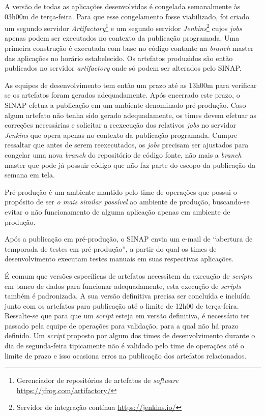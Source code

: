 A versão de todas as aplicações desenvolvidas é congelada semanalmente
às 03h00m de terça-feira. Para que esse congelamento fosse viabilizado, foi
criado um segundo servidor \textit{Artifactory}\footnote{Gerenciador de
repositórios de artefatos de \textit{software} \url{https://jfrog.com/artifactory/}}
e um segundo servidor \textit{Jenkins}\footnote{Servidor de integração contínua
\url{https://jenkins.io/}}
cujos \textit{jobs} apenas podem ser executados no
contexto da publicação programada. Uma primeira construção é executada com
base no código contante na \textit{branch} master das aplicações no horário
estabelecido. Os artefatos produzidos são então publicados no servidor
\textit{artifactory} onde só podem ser alterados pelo \acrshort{SINAP}.

As equipes de desenvolvimento tem então um prazo até
as 13h00m para verificar se os artefatos foram gerados adequadamente. Após
encerrado este prazo, o \acrshort{SINAP} efetua a publicação
em um ambiente denominado pré-produção. Caso algum artefato não tenha sido
gerado adequadamente, os times devem efetuar as correções necessárias e
solicitar a reexecução dos relativos \textit{jobs} no servidor \textit{Jenkins}
que opera apenas no contexto da publicação programada. Cumpre ressaltar que
antes de serem reexecutados, os \textit{jobs} precisam ser ajustados para
congelar uma nova \textit{branch} do repositório de código fonte, não mais a
\textit{branch} master que pode já possuir código que não faz parte do escopo
da publicação da semana em tela.

Pré-produção é um ambiente mantido pelo time de operações que possui o
propósito de ser \emph{o mais similar possível} ao ambiente de produção,
buscando-se evitar o não funcionamento de alguma aplicação apenas em ambiente
de produção.

Após a publicação em pré-produção, o \acrshort{SINAP} envia um e-mail de
``abertura de temporada de testes em pré-produção'', a partir do qual os times
de desenvolvimento executam testes manuais em suas respectivas aplicações.

É comum que versões específicas de artefatos necessitem da execução de
\textit{scripts} em banco de dados para funcionar adequadamente, esta execução
de \textit{scripts} também é padronizada. A sua versão definitiva
precisa ser concluída e incluída junto com os artefatos para publicação até o
limite de 12h00 de terça-feira. Ressalte-se que para que um \textit{script}
esteja em versão definitiva, é necessário ter passado pela equipe de operações
para validação, para a qual não há prazo definido. Um \textit{script}
proposto por algum dos times de desenvolvimento durante o dia de segunda-feira
tipicamente não é validado pelo time de operações até o limite de prazo e isso
ocasiona erros na publicação dos artefatos relacionados.

